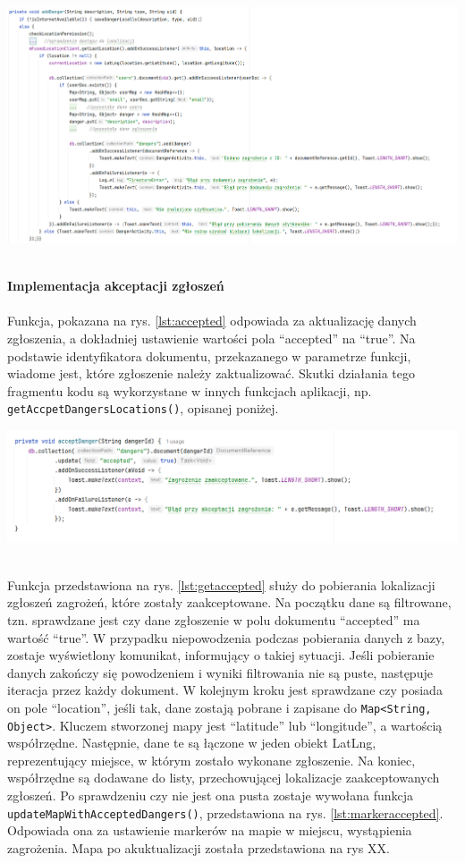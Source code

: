 \noindent
\begin{minipage}{\linewidth}
    \label{lst:danger}
    \centering
    \includegraphics[width=0.6\linewidth]{img/kod/imp-adddanger.png}
\end{minipage}
\\

\textbf{Implementacja akceptacji zgłoszeń} \\ 
\\
Funkcja, pokazana na rys. \ref{lst:accepted} odpowiada za aktualizację danych zgłoszenia, a dokładniej ustawienie wartości pola “accepted” na “true”. Na podstawie identyfikatora dokumentu, przekazanego w parametrze funkcji, wiadome jest, które zgłoszenie należy zaktualizować. Skutki działania tego fragmentu kodu są wykorzystane w innych funkcjach aplikacji, np. \verb|getAccpetDangersLocations()|, opisanej poniżej.

\noindent
\begin{minipage}{\linewidth}
    \label{lst:accepted}
    \centering
    \includegraphics[width=0.6\linewidth]{img/kod/imp-acceptdanger.png}
\end{minipage}
\\

Funkcja przedstawiona na rys. \ref{lst:getaccepted} służy do pobierania lokalizacji zgłoszeń zagrożeń, które zostały zaakceptowane. Na początku dane są filtrowane, tzn. sprawdzane jest czy dane zgłoszenie w polu dokumentu “accepted” ma wartość “true”. W przypadku niepowodzenia podczas pobierania danych z bazy, zostaje wyświetlony komunikat, informujący o takiej sytuacji. Jeśli pobieranie danych zakończy się powodzeniem i wyniki filtrowania nie są puste, następuje iteracja przez każdy dokument. W kolejnym kroku jest sprawdzane czy posiada on pole “location”, jeśli tak, dane zostają pobrane i zapisane do \verb|Map<String, Object>|. Kluczem stworzonej mapy jest “latitude” lub “longitude”, a wartością współrzędne. Następnie, dane te są łączone w jeden obiekt LatLng, reprezentujący miejsce, w którym zostało wykonane zgłoszenie. Na koniec, współrzędne są dodawane do listy, przechowującej lokalizacje zaakceptowanych zgłoszeń. Po sprawdzeniu czy nie jest ona pusta zostaje wywołana funkcja \verb|updateMapWithAcceptedDangers()|, przedstawiona na rys. \ref{lst:markeraccepted}. Odpowiada ona za ustawienie markerów na mapie w miejscu, wystąpienia zagrożenia. Mapa po akuktualizacji została przedstawiona na rys XX.\\

